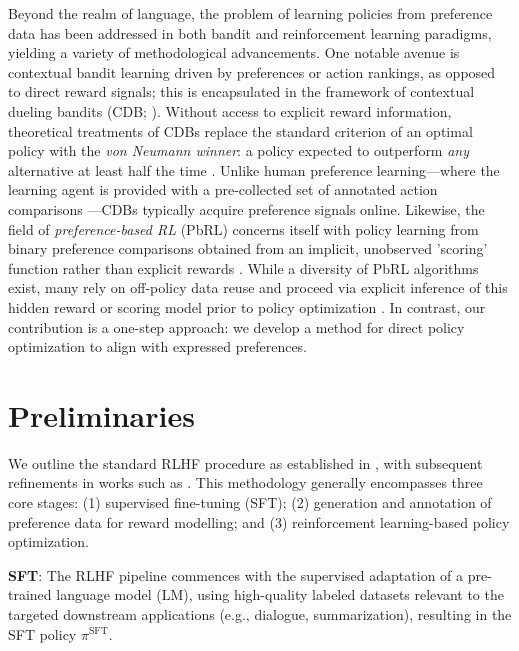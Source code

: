 Beyond the realm of language, the problem of learning policies from preference data has been addressed in both bandit and reinforcement learning paradigms, yielding a variety of methodological advancements. One notable avenue is contextual bandit learning driven by preferences or action rankings, as opposed to direct reward signals; this is encapsulated in the framework of contextual dueling bandits (CDB; \cite{yue2012karmed,dudik2015contextual}). Without access to explicit reward information, theoretical treatments of CDBs replace the standard criterion of an optimal policy with the \textit{von Neumann winner}: a policy expected to outperform \textit{any} alternative at least half the time \citep{dudik2015contextual}. Unlike human preference learning—where the learning agent is provided with a pre-collected set of annotated action comparisons \citep{yan2022human}—CDBs typically acquire preference signals online. Likewise, the field of \textit{preference-based RL} (PbRL) concerns itself with policy learning from binary preference comparisons obtained from an implicit, unobserved 'scoring' function rather than explicit rewards \citep{BusaFekete2014,ruiz2023dueling}. While a diversity of PbRL algorithms exist, many rely on off-policy data reuse and proceed via explicit inference of this hidden reward or scoring model prior to policy optimization \citep{jain2013learning,BusaFekete2014,christiano2017deep,sadigh2017active,kupcsik2018learning}. In contrast, our contribution is a one-step approach: we develop a method for direct policy optimization to align with expressed preferences.

\section{Preliminaries}\label{section:prelims}

We outline the standard RLHF procedure as established in \citeauthor{ziegler2020finetuning}, with subsequent refinements in works such as \citep{stiennon2022learning, bai2022training, ouyang2022training}. This methodology generally encompasses three core stages: (1) supervised fine-tuning (SFT); (2) generation and annotation of preference data for reward modelling; and (3) reinforcement learning-based policy optimization.

\textbf{SFT}: The RLHF pipeline commences with the supervised adaptation of a pre-trained language model (LM), using high-quality labeled datasets relevant to the targeted downstream applications (e.g., dialogue, summarization), resulting in the SFT policy $\pi^\text{SFT}$.


